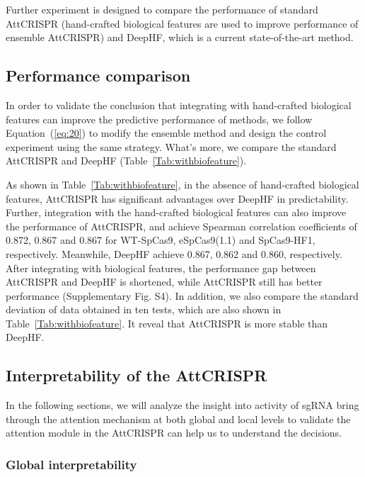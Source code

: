 \documentclass{bioinfo}
\begin{document}
Further experiment is designed to compare the performance of standard AttCRISPR (hand-crafted biological features are used to improve performance of ensemble AttCRISPR)
 and DeepHF, which is a current state-of-the-art method. 

\subsection{Performance comparison}\label{section:comparison}

In order to validate the conclusion that integrating with hand-crafted biological features can improve the predictive performance of methods, 
we follow Equation~(\ref{eq:20}) to modify the ensemble method and design the control experiment using the same strategy. 
What's more, we compare the standard AttCRISPR and DeepHF (Table~\ref{Tab:withbiofeature}).

As shown in Table~\ref{Tab:withbiofeature}, in the absence of hand-crafted biological features, AttCRISPR has significant advantages over DeepHF in predictability. 
Further, integration with the hand-crafted biological features can also improve the performance of AttCRISPR, 
and achieve Spearman correlation coefficients of 0.872, 0.867 and 0.867 for WT-SpCas9, eSpCas9(1.1) and SpCas9-HF1, respectively. 
Meanwhile, DeepHF achieve 0.867, 0.862 and 0.860, respectively. 
After integrating with biological features, the performance gap between AttCRISPR and DeepHF is shortened, while AttCRISPR still has better performance (Supplementary Fig. S4). 
In addition, we also compare the standard deviation of data obtained in ten tests, which are also shown in Table~\ref{Tab:withbiofeature}. 
It reveal that AttCRISPR is more stable than DeepHF.

\subsection{Interpretability of the AttCRISPR}\label{section:interpretability}

In the following sections, we will analyze the insight into activity of sgRNA bring through the attention mechanism at both global and local levels 
to validate the attention module in the AttCRISPR can help us to understand the decisions. 

\subsubsection{Global interpretability}
\end{document}
